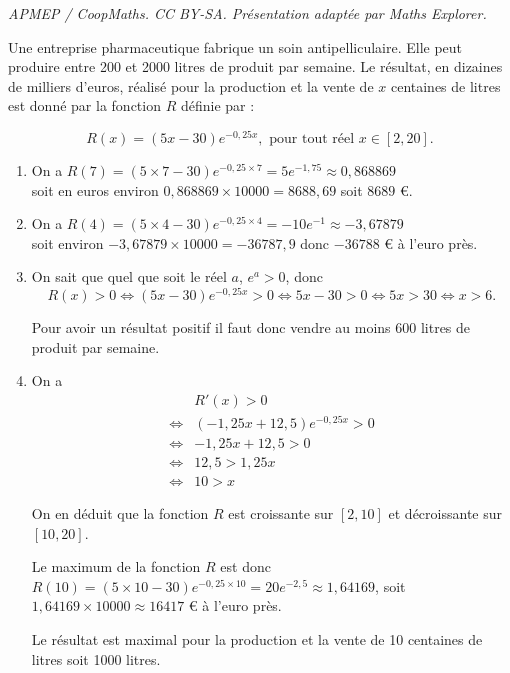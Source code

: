 \documentclass[10pt]{article}
\begin{document}
\noindent\textit{APMEP / CoopMaths. CC BY-SA. Présentation adaptée par Maths Explorer.}\par\medskip
Une entreprise pharmaceutique fabrique un soin antipelliculaire. Elle peut produire entre 200 et 2000 litres de produit par semaine. Le résultat, en dizaines de milliers d’euros, réalisé pour la production et la vente de $x$ centaines de litres est donné par la fonction $R$ définie par :
	
	\[ R(x)= (5x - 30)e^{-0,25x}, \text{ pour tout réel } x \in [2, 20]. \]
	
\begin{enumerate}
	\item 	On a $R(7) = (5 \times 7 - 30)e^{-0,25 \times 7} = 5e^{-1,75} \approx 0,868869$\\
	 soit en euros environ $0,868869 \times 10000 = 8688,69$ soit $8689$ €.
	\item	On a $R(4)= (5 \times 4 - 30)e^{-0,25 \times 4} = -10e^{-1} \approx -3,67879$ \\
	soit environ $-3,67879 \times 10000 = -36787,9$ donc $-36788$ € à l’euro près.
	\item	On sait que quel que soit le réel $a$, $e^a > 0$, donc
	\[ R(x)> 0 \iff (5x - 30)e^{-0,25x} > 0 \iff 5x - 30 > 0 \iff 5x > 30 \iff x > 6. \]
	
	Pour avoir un résultat positif il faut donc vendre au moins 600 litres de produit par semaine.
	\item	On a  \begin{align*}
	&R'(x) > 0 \\
	\iff &(-1,25x + 12,5)e^{-0,25x} > 0 \\
	\iff& -1,25x + 12,5 > 0 \\
	\iff& 12,5 > 1,25x \\
	\iff& 10 > x
	\end{align*}
	

	
	On en déduit que la fonction $R$ est croissante sur $[2, 10]$ et décroissante sur $[10, 20]$.
	
	Le maximum de la fonction $R$ est donc $R(10) = (5 \times 10 - 30)e^{-0,25 \times 10} = 20e^{-2,5} \approx 1,64169$, soit $1,64169 \times 10000 \approx 16417$ € à l’euro près.
	
	Le résultat est maximal pour la production et la vente de 10 centaines de litres soit 1000 litres.
\end{enumerate}
\end{document}
